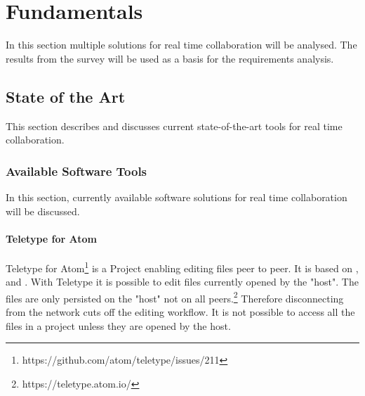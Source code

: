\chapter{Fundamentals}
\label{sec:fundamentals}

In this section multiple solutions for real time collaboration will be analysed. 
The results from the survey will be used as a basis for the requirements analysis.

\section{State of the Art}
\label{sec:stateoftheart}

This section describes and discusses current state-of-the-art tools for real time collaboration.

\subsection{Available Software Tools}

In this section, currently available software solutions for real time collaboration will be discussed.

\subsubsection{Teletype for Atom}
Teletype for Atom\footnote{https://github.com/atom/teletype/issues/211} is a Project enabling editing files peer to peer. It is based on \cite{Oster:2006:DataconsistencyforP2Pcollaborativeediting}, \cite{YuWeihai:2014} and \cite{BriotUrsoShapiro:2016:HighResponsivenessGroupEditing}.
With Teletype it is possible to edit files currently opened by the "host". The files are only persisted on the "host" not on all peers.\footnote{https://teletype.atom.io/}
Therefore disconnecting from the network cuts off the editing workflow. It is not possible to access all the files in a project unless they are opened by the host. 
